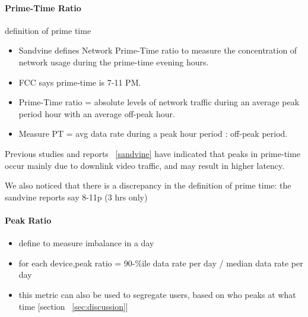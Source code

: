 \paragraph{Prime-Time Ratio} definition of prime time
\begin{itemize}
\itemsep0em 
\item Sandvine defines Network Prime-Time ratio to measure the concentration of network usage during the prime-time evening hours.
\item FCC says prime-time is 7-11 PM.
\item Prime-Time ratio = absolute levels of network traffic during an average peak period hour with an average off-peak hour.
\item Measure PT = avg data rate during a peak hour period : off-peak period.
\end{itemize}

 Previous studies and reports ~\ref{sandvine} have indicated that peaks in prime-time occur mainly due to downlink video traffic, and may result in higher latency.
 
 We also noticed that there is a discrepancy in the definition of prime time: the sandvine reports say 8-11p (3 hrs only)

\paragraph{Peak Ratio}
\begin{itemize}
\itemsep0em
\item define to measure imbalance in a day
\item for each device,peak ratio  =    90-\%ile data rate per day / median data rate per day
\item this metric can also be used to segregate users, based on who peaks at what time [section ~\ref{sec:discussion}]
\end{itemize}

